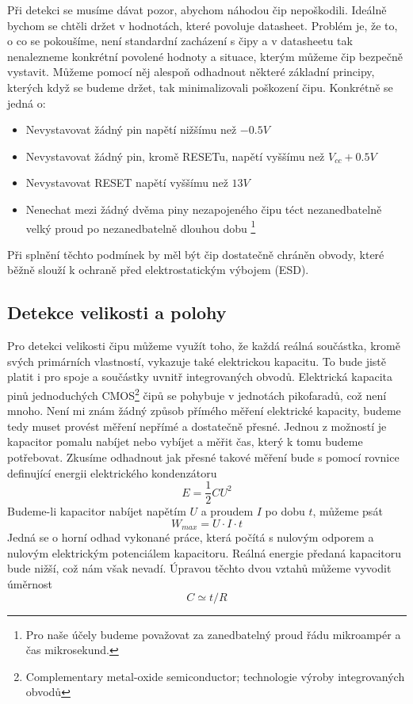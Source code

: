 \documentclass[11pt,a4paper,twoside,openright]{report}
\begin{document}
Při detekci se musíme dávat pozor, abychom náhodou čip nepoškodili. Ideálně bychom se chtěli držet v hodnotách, které povoluje datasheet. Problém je, že to, o co se pokoušíme, není standardní zacházení s čipy a v datasheetu tak nenalezneme konkrétní povolené hodnoty a situace, kterým můžeme čip bezpečně vystavit. Můžeme pomocí něj alespoň odhadnout některé základní principy, kterých když se budeme držet, tak minimalizovali poškození čipu. Konkrétně se jedná o:
\begin{itemize}
	\item Nevystavovat žádný pin napětí nižšímu než $-0.5V$
	\item Nevystavovat žádný pin, kromě RESETu, napětí vyššímu než ${V}_{cc} + 0.5V$
	\item Nevystavovat RESET napětí vyššímu než $13V$
	\item Nenechat mezi žádný dvěma piny nezapojeného čipu téct nezanedbatelně velký proud po nezanedbatelně dlouhou dobu \footnote{Pro naše účely budeme považovat za zanedbatelný proud řádu mikroampér a čas mikrosekund.}
\end{itemize}
Při splnění těchto podmínek by měl být čip dostatečně chráněn obvody, které běžně slouží k ochraně před elektrostatickým výbojem (ESD). 

\subsection {Detekce velikosti a polohy \label{theory:capacitance}}

Pro detekci velikosti čipu můžeme využít toho, že každá reálná součástka, kromě svých primárních vlastností, vykazuje také elektrickou kapacitu. To bude jistě platit i pro spoje a součástky uvnitř integrovaných obvodů. Elektrická kapacita pinů jednoduchých CMOS\footnote{Complementary metal-oxide semiconductor; technologie výroby integrovaných obvodů} čipů\cite{multiplexer, switch2, switch1} se pohybuje v jednotách pikofaradů, což není mnoho. Není mi znám žádný způsob přímého měření elektrické kapacity, budeme tedy muset provést měření nepřímé a dostatečně přesné. Jednou z možností je kapacitor pomalu nabíjet nebo vybíjet a měřit čas, který k tomu budeme potřebovat. Zkusíme odhadnout jak přesné takové měření bude s pomocí rovnice definující energii elektrického kondenzátoru \begin{equation} E = \frac{1}{2}CU^2 \end{equation}
Budeme-li kapacitor nabíjet napětím $U$ a proudem $I$ po dobu $t$, můžeme psát
\begin{equation} {W}_{max} = U \cdot I \cdot t \end{equation} 
Jedná se o horní odhad vykonané práce, která počítá s nulovým odporem a nulovým elektrickým potenciálem kapacitoru. Reálná energie předaná kapacitoru bude nižší, což nám však nevadí. Úpravou těchto dvou vztahů můžeme vyvodit úměrnost
\begin{equation} C \simeq t / R \end{equation}
\end{document}
